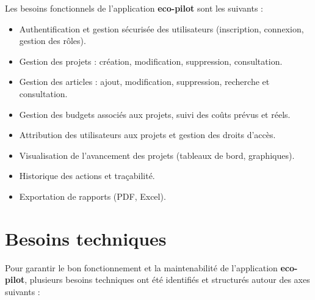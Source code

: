 \documentclass[12pt,a4paper]{report}
\begin{document}
Les besoins fonctionnels de l’application \textbf{eco-pilot} sont les suivants :
\begin{itemize}
    \item Authentification et gestion sécurisée des utilisateurs (inscription, connexion, gestion des rôles).
    \item Gestion des projets : création, modification, suppression, consultation.
    \item Gestion des articles : ajout, modification, suppression, recherche et consultation.
    \item Gestion des budgets associés aux projets, suivi des coûts prévus et réels.
    \item Attribution des utilisateurs aux projets et gestion des droits d’accès.
    \item Visualisation de l’avancement des projets (tableaux de bord, graphiques).
    \item Historique des actions et traçabilité.
    \item Exportation de rapports (PDF, Excel).
\end{itemize}

\section{Besoins techniques}

Pour garantir le bon fonctionnement et la maintenabilité de l’application \textbf{eco-pilot}, plusieurs besoins techniques ont été identifiés et structurés autour des axes suivants :
\end{document}
